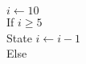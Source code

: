 \documentclass[preview]{standalone}
\begin{document}
\begin{center}
\begin{algorithmic}
            \State $i \gets 10$ 
            \\If {$i\geq 5$}
            \\    State $i \gets i-1$
            \\Else
            \end{algorithmic}
\end{center}
\end{document}
